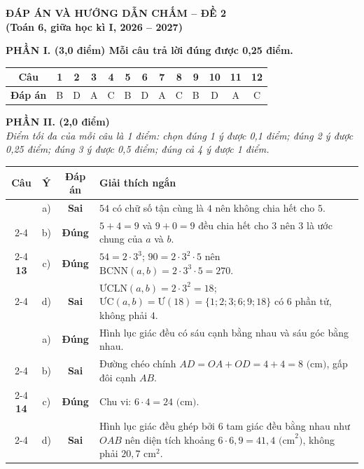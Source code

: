 \newpage
\begin{center}
	{\Large\textbf{ĐÁP ÁN VÀ HƯỚNG DẪN CHẤM -- ĐỀ 2}}\\[4pt]
	\textbf{(Toán 6, giữa học kì I, 2026 -- 2027)}
\end{center}

\vspace{6pt}

\noindent\textbf{PHẦN I. (3,0 điểm) Mỗi câu trả lời đúng được 0,25 điểm.}

\begin{center}
\renewcommand{\arraystretch}{1.3}
\begin{tabular}{|c|c|c|c|c|c|c|c|c|c|c|c|c|}
	\hline
	\textbf{Câu} & \textbf{1} & \textbf{2} & \textbf{3} & \textbf{4} & \textbf{5} & \textbf{6} & \textbf{7} & \textbf{8} & \textbf{9} & \textbf{10} & \textbf{11} & \textbf{12} \\
	\hline
	\textbf{Đáp án} & B & D & A & C & B & D & A & C & B & D & A & C \\
	\hline
\end{tabular}
\end{center}

\vspace{4pt}

\noindent\textbf{PHẦN II. (2,0 điểm)}\\
\textit{Điểm tối đa của mỗi câu là 1 điểm: chọn đúng 1 ý được 0,1 điểm; đúng 2 ý được 0,25 điểm; đúng 3 ý được 0,5 điểm; đúng cả 4 ý được 1 điểm.}

\begin{center}
\renewcommand{\arraystretch}{1.3}
\begin{tabular}{|c|c|c|p{11.5cm}|}
	\hline
	\textbf{Câu} & \textbf{Ý} & \textbf{Đáp án} & \centering\textbf{Giải thích ngắn} \tabularnewline
	\hline
	& a) & \textbf{Sai} & $54$ có chữ số tận cùng là $4$ nên không chia hết cho $5$. \tabularnewline
	\cline{2-4}
	& b) & \textbf{Đúng} & $5 + 4 = 9$ và $9 + 0 = 9$ đều chia hết cho $3$ nên $3$ là ước chung của $a$ và $b$. \tabularnewline
	\cline{2-4}
	\textbf{13} & c) & \textbf{Đúng} & $54 = 2 \cdot 3^3$; $90 = 2 \cdot 3^2 \cdot 5$ nên $\text{BCNN}(a, b) = 2 \cdot 3^3 \cdot 5 = 270$. \tabularnewline
	\cline{2-4}
	& d) & \textbf{Sai} & $\text{ƯCLN}(a, b) = 2 \cdot 3^2 = 18$; $\text{ƯC}(a, b) = \text{Ư}(18) = \{1; 2; 3; 6; 9; 18\}$ có $6$ phần tử, không phải $4$. \tabularnewline
	\hline
	& a) & \textbf{Đúng} & Hình lục giác đều có sáu cạnh bằng nhau và sáu góc bằng nhau. \tabularnewline
	\cline{2-4}
	& b) & \textbf{Sai} & Đường chéo chính $AD = OA + OD = 4 + 4 = 8\text{ (cm)}$, gấp đôi cạnh $AB$. \tabularnewline
	\cline{2-4}
	\textbf{14} & c) & \textbf{Đúng} & Chu vi: $6 \cdot 4 = 24\text{ (cm)}$. \tabularnewline
	\cline{2-4}
	& d) & \textbf{Sai} & Hình lục giác đều ghép bởi $6$ tam giác đều bằng nhau như $OAB$ nên diện tích khoảng $6 \cdot 6{,}9 = 41{,}4\text{ (cm}^2\text{)}$, không phải $20{,}7\text{ cm}^2$. \tabularnewline
	\hline
\end{tabular}
\end{center}

